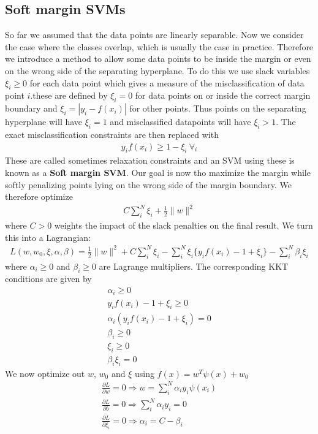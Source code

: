 \documentclass[main]{subfiles}
\begin{document}
\subsection{Soft margin SVMs}
So far we assumed that the data points are linearly separable. Now we consider the case where the classes overlap, which is usually the case in practice. Therefore we introduce a method to allow some data points to be inside the margin or even on the wrong side of the separating hyperplane. To do this we use slack variables $\xi_i \geq 0$ for each data point which gives a measure of the misclassification of data point $i$.these are defined by $\xi_i = 0$ for data points on or inside the correct margin boundary and $\xi_i=|y_i - f(x_i)|$ for other points. Thus points on the separating hyperplane will have $\xi_i=1$ and misclassified datapoints will have $\xi_i > 1$. The exact misclassification constraints are then replaced with 
\begin{align}
y_i f(x_i) \geq 1 - \xi_i \ \forall_i
\end{align}
These are called sometimes relaxation constraints and an SVM using these is known as a \textbf{Soft margin SVM}. Our goal is now tho maximize the margin while softly penalizing points lying on the wrong side of the margin boundary. We therefore optimize
\begin{align}
C \sum_i^N \xi_i + \frac{1}{2} \parallel w \parallel^2
\end{align}
where $C>0$ weights the impact of the slack penalties on the final result.
We turn this into a Lagrangian:
\begin{align}
L(w,w_0,\xi,\alpha,\beta)=\frac{1}{2}\parallel w \parallel^2+C \sum_i^N \xi_i-\sum_i^N \xi_i \{y_i f(x_i)-1 + \xi_i\}-\sum_i^N \beta_i \xi_i
\end{align}
where $\alpha_i \geq 0$ and $\beta_i \geq 0$ are Lagrange multipliers. The corresponding KKT conditions are given by
\begin{align}
\alpha_i \geq 0 \\
y_i f(x_i)-1+\xi_i \geq 0 \\
\alpha_i(y_i f(x_i)-1+\xi_i) = 0 \\
\beta_i \geq 0 \\
\xi_i \geq 0 \\
\beta_i \xi_i = 0
\end{align}
We now optimize out $w$, $w_0$ and $\xi$ using $f(x)=w^T\psi(x)+w_0$
\begin{align}
\frac{\partial L}{\partial w}=0 \Rightarrow w=\sum_i^N\alpha_i y_i\psi(x_i) \\
\frac{\partial L}{\partial b}=0 \Rightarrow \sum_i^N\alpha_i y_i = 0 \\
\frac{\partial L}{\partial \xi_i}=0 \Rightarrow \alpha_i=C-\beta_i
\end{align}
\end{document}
